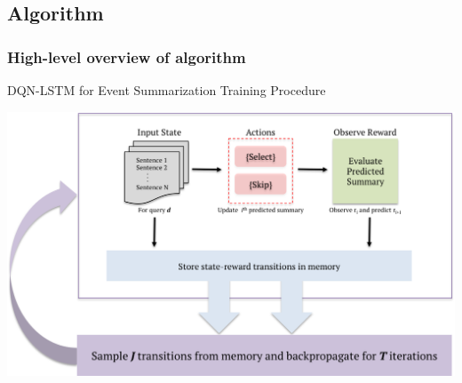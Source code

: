 \documentclass[]{beamer}
\begin{document}
\subsection{Algorithm}
	\begin{frame}
			\vspace{0.12cm}\frametitle{High-level overview of algorithm}
			DQN-LSTM for Event Summarization Training Procedure
			\begin{center}
			  \includegraphics[scale=0.45]{DQN_LSTM_Algorithm}
			\end{center}
	\end{frame}
\end{document}
